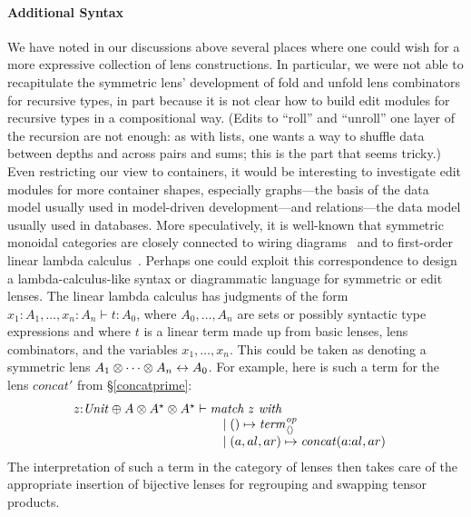 \paragraph*{Additional Syntax}
We have noted in our discussions above several places where one could wish
for a more expressive collection of lens constructions. In particular, we
were not able to recapitulate the symmetric lens' development of fold and
unfold lens combinators for recursive types, in part because it is not clear
how to build edit modules for recursive types in a compositional way. (Edits
to ``roll'' and ``unroll'' one layer of the recursion are not enough: as
with lists, one wants a way to shuffle data between depths and across pairs
and sums; this is the part that seems tricky.) Even restricting our view to
containers, it would be interesting to investigate edit modules for more
container shapes, especially graphs---the basis of the data model usually
used in model-driven development---and relations---the data model usually
used in databases. More speculatively, it is well-known that symmetric
monoidal categories are closely connected to wiring
diagrams~\cite{selinger2011survey} and to first-order linear lambda
calculus~\cite{seely1987linear}. Perhaps one could exploit this
correspondence to design a lambda-calculus-like syntax or diagrammatic
language for symmetric or edit lenses. The linear lambda calculus has
judgments of the form $x_1{:}A_1,\dots,x_n{:}A_n\vdash t:A_0$, where
$A_0,\dots,A_n$ are sets or possibly syntactic type expressions and where
$t$ is a linear term made up from basic lenses, lens combinators, and the
variables $x_1,\dots,x_n$. This could be taken as denoting a symmetric lens
$A_1\otimes\dots\otimes A_n\leftrightarrow A_0$. For example, here is such a term for
the lens $\mathit{concat}'$ from \S\ref{concatprime}:
\[\begin{array}{@{}l}
z{:}\Unit \oplus A \otimes A\LIST\otimes A\LIST\vdash
    \begin{array}[t]{@{}l}
    \textit{match}\ z\ \textit{with} \\
    \quad \mid\mlinl\unit \mapsto \const_{\NIL}\op\\
    \quad\mid\mlinr(a,al,ar)\mapsto \mathit{concat}(a\CONS al,ar)
    \end{array}
\end{array}
\]
The interpretation of such a term in the category of lenses then takes care
of the appropriate insertion of bijective lenses for regrouping and swapping
tensor products.

